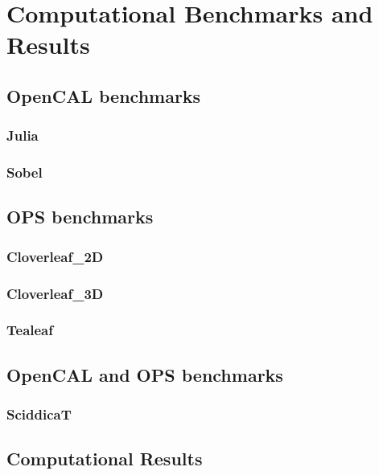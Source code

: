 \chapter{Computational Benchmarks and Results}

\section{OpenCAL benchmarks}
\subsection{Julia}

\subsection{Sobel}

\section{OPS benchmarks}

\subsection{Cloverleaf\_2D}

\subsection{Cloverleaf\_3D}

\subsection{Tealeaf}

\section{OpenCAL and OPS benchmarks}

\subsection{SciddicaT}

\section{Computational Results}